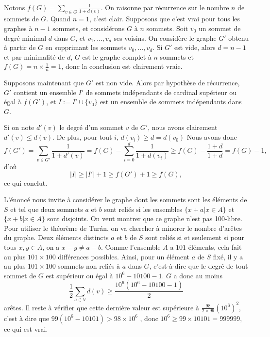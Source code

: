 \begin{sol} Notons $f(G) = \sum_{v\in G}\frac{1}{1+d(v)}$. On raisonne par récurrence sur le nombre $n$ de sommets de $G$. Quand $n=1$, c'est clair.
Supposons que c'est vrai pour tous les graphes à $n-1$ sommets, et considérons $G$ à $n$ sommets. Soit $v_0$ un sommet de degré minimal $d$ dans $G$, et $v_1,\ldots, v_d$ ses voisins. On considère le graphe $G'$ obtenu à partir de $G$ en supprimant les sommets $v_0,\ldots,v_d$. Si $G'$ est vide, alors $d = n-1$ et par minimalité de $d$, $G$ est le graphe complet à $n$ sommets et $f(G) = n\times \frac{1}{n} = 1$, donc la conclusion est clairement vraie. 

Supposons maintenant que $G'$ est non vide. Alors par hypothèse de récurrence, $G'$ contient un ensemble $I'$ de sommets indépendants de cardinal supérieur ou égal à $f(G')$, et $I:= I'\cup \{v_0\}$ est un ensemble de sommets indépendants dans $G$. 

Si on note $d'(v)$ le degré d'un sommet $v$ de $G'$, nous avons clairement $d'(v)\leq d(v)$. De plus, pour tout $i$, $d(v_i)\geq d = d(v_0)$ Nous avons donc 
$$f(G') = \sum_{v\in G'}\frac{1}{1 + d'(v)} = f(G) - \sum_{i=0}^d\frac{1}{1 + d(v_i)}\geq f(G) - \frac{1+d}{1+d} = f(G) - 1,$$
d'où
$$|I|\geq |I'| + 1\geq f(G')  + 1\geq f(G),$$
ce qui conclut.
\end{sol}

\begin{sol} L'énoncé nous invite à considérer le graphe dont les sommets sont les éléments de $S$ et tel que deux sommets $a$ et $b$ sont reliés si les ensembles $\{x + a| x\in A\}$ et $\{x + b|x\in A\}$ sont disjoints. On veut montrer que ce graphe n'est pas 100-libre. Pour utiliser le théorème de Tur\'an, on va chercher à minorer le nombre d'arêtes du graphe. Deux éléments distincts  $a$ et $b$ de $S$ sont reliés si et seulement si pour tous $x,y\in A$, on a $x-y\neq a-b$. Comme l'ensemble $A$ a $101$ éléments, cela fait au plus $101\times 100$ différences possibles. Ainsi, pour un élément $a$ de $S$ fixé, il y a au plus $101\times 100$ sommets non reliés à $a$ dans $G$, c'est-à-dire que le degré de tout sommet de $G$ est supérieur ou égal à 
$10^6 - 10100 -1$. $G$ a donc au moins 
$$\frac{1}{2}\sum_{a\in V}d(v)\geq \frac{10^6(10^6 - 10100 - 1)}{2}$$
arêtes. Il reste à vérifier que cette dernière valeur est supérieure à $\frac{98}{2\times 99}(10^6)^2$, c'est à dire que
$99(10^6 - 10101) > 98\times 10^6$ , donc $10^6\geq 99\times 10101 = 999999$, ce qui est vrai.
\end{sol}

